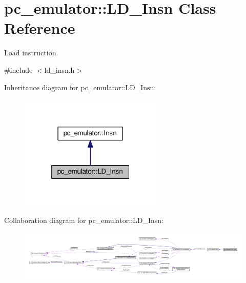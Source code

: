 \hypertarget{classpc__emulator_1_1LD__Insn}{}\section{pc\+\_\+emulator\+:\+:L\+D\+\_\+\+Insn Class Reference}
\label{classpc__emulator_1_1LD__Insn}


Load instruction.  




{\ttfamily \#include $<$ld\+\_\+insn.\+h$>$}



Inheritance diagram for pc\+\_\+emulator\+:\+:L\+D\+\_\+\+Insn\+:
\nopagebreak
\begin{figure}[H]
\begin{center}
\leavevmode
\includegraphics[width=193pt]{classpc__emulator_1_1LD__Insn__inherit__graph}
\end{center}
\end{figure}


Collaboration diagram for pc\+\_\+emulator\+:\+:L\+D\+\_\+\+Insn\+:
\nopagebreak
\begin{figure}[H]
\begin{center}
\leavevmode
\includegraphics[width=350pt]{classpc__emulator_1_1LD__Insn__coll__graph}
\end{center}
\end{figure}
